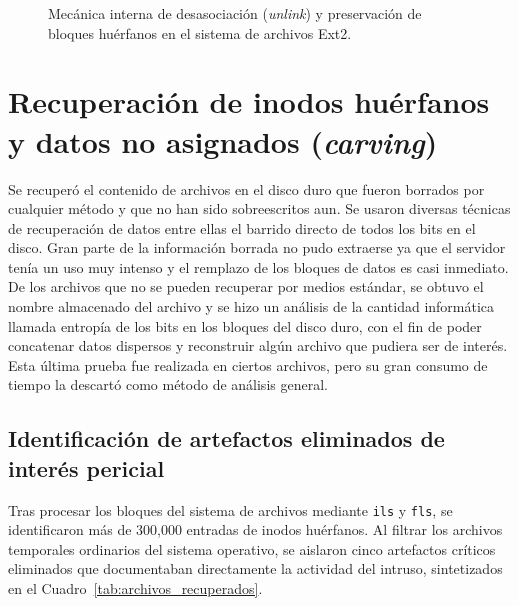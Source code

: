 \begin{figure}[htbp]
\caption{Mecánica interna de desasociación (\textit{unlink}) y preservación de bloques huérfanos en el sistema de archivos Ext2.}
\label{fig:ext2_deletion_carving}
\end{figure}

\section{Recuperación de inodos huérfanos y datos no asignados (\textit{carving})}


 Se recuperó el contenido de archivos en el disco duro que fueron
borrados por cualquier método y que no han sido sobreescritos aun. Se
usaron diversas técnicas de recuperación de datos entre ellas el barrido directo 
de todos los bits en el disco. Gran parte de la
información borrada no pudo extraerse ya que el servidor tenía un uso
muy intenso y el remplazo de los bloques de datos es casi inmediato. De los
archivos que no se pueden recuperar por medios estándar, se obtuvo el
nombre almacenado del archivo y se hizo un análisis de la cantidad informática llamada entropía 
de los bits en
los bloques del disco duro, con el fin de poder concatenar datos dispersos y
reconstruir algún archivo que pudiera ser de interés. Esta última
prueba fue realizada en ciertos archivos, pero su gran consumo de tiempo la descartó como
método de análisis general.


\subsection{Identificación de artefactos eliminados de interés pericial}

Tras procesar los bloques del sistema de archivos mediante \texttt{ils} y \texttt{fls}, se identificaron más de 300,000 entradas de inodos huérfanos. Al filtrar los archivos temporales ordinarios del sistema operativo, se aislaron cinco artefactos críticos eliminados que documentaban directamente la actividad del intruso, sintetizados en el Cuadro~\ref{tab:archivos_recuperados}.


